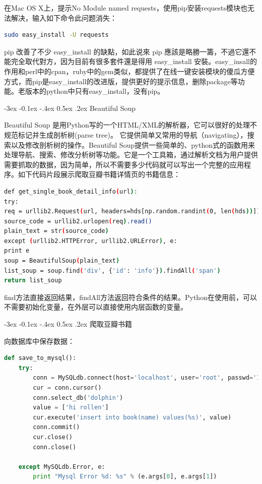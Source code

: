 \documentclass[12pt]{book}
\makeatletter
\numberwithin{dummy}{section}
\theoremstyle{ocrenumbox}
\theoremstyle{blacknumex}
\theoremstyle{blacknumbox}
\theoremstyle{ocrenum}
\renewcommand{\subsection}{\@startsection {subsection}{2}{\z@}
	{-3ex \@plus -0.1ex \@minus -.4ex}
	{0.5ex \@plus.2ex }
	{\normalfont\sffamily\bfseries}}
\makeatother
\begin{document}
在Mac OS X上，提示No Module named requests，使用pip安装requests模块也无法解决，输入如下命令此问题消失：

\begin{lstlisting}[language=Bash]
sudo easy_install -U requests
\end{lstlisting}

pip 改善了不少 easy\_install 的缺點，如此说來 pip 應該是略勝一籌，不過它還不能完全取代對方，因为目前有很多套件還是得用 easy\_install 安裝。easy\_insall的作用和perl中的cpan，ruby中的gem类似，都提供了在线一键安装模块的傻瓜方便方式，而pip是easy\_install的改进版，提供更好的提示信息，删除package等功能。老版本的python中只有easy\_install，没有pip。

\subsection{Beautiful Soup}

Beautiful Soup 是用Python写的一个HTML/XML的解析器，它可以很好的处理不规范标记并生成剖析树(parse tree)。 它提供简单又常用的导航（navigating），搜索以及修改剖析树的操作。Beautiful Soup提供一些简单的、python式的函数用来处理导航、搜索、修改分析树等功能。它是一个工具箱，通过解析文档为用户提供需要抓取的数据，因为简单，所以不需要多少代码就可以写出一个完整的应用程序。如下代码片段展示爬取豆瓣书籍详情页的书籍信息：

\begin{lstlisting}[language=Bash]
def get_single_book_detail_info(url):
try:
req = urllib2.Request(url, headers=hds[np.random.randint(0, len(hds))])
source_code = urllib2.urlopen(req).read()
plain_text = str(source_code)
except (urllib2.HTTPError, urllib2.URLError), e:
print e
soup = BeautifulSoup(plain_text)
list_soup = soup.find('div', {'id': 'info'}).findAll('span')
return list_soup
\end{lstlisting}

find方法直接返回结果，findAll方法返回符合条件的结果。Python在使用前，可以不需要初始化变量，在外层可以直接使用内层函数的变量。

\subsection{爬取豆瓣书籍}

向数据库中保存数据：

\begin{lstlisting}[language=Python]
def save_to_mysql():
	try:
		conn = MySQLdb.connect(host='localhost', user='root', passwd='123456', port=3306)
		cur = conn.cursor()
		conn.select_db('dolphin')
		value = ['hi rollen']
		cur.execute('insert into book(name) values(%s)', value)
		conn.commit()
		cur.close()
		conn.close()
	
	except MySQLdb.Error, e:
		print "Mysql Error %d: %s" % (e.args[0], e.args[1])
\end{lstlisting}
\end{document}

